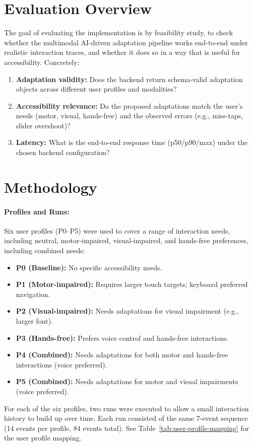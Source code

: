 \documentclass[openany]{book}
\begin{document}
\section{Evaluation Overview}
The goal of evaluating the implementation is by feasibility study, to check whether the multimodal AI-driven adaptation pipeline works end-to-end under realistic interaction traces, and whether it does so in a way that is useful for accessibility. Concretely:
\begin{enumerate}
    \item \textbf{Adaptation validity:} Does the backend return schema-valid adaptation objects across different user profiles and modalities?
    \item \textbf{Accessibility relevance:} Do the proposed adaptations match the user’s needs (motor, visual, hands-free) and the observed errors (e.g., miss-taps, slider overshoot)?
    \item \textbf{Latency:} What is the end-to-end response time (p50/p90/max) under the chosen backend configuration?
\end{enumerate}

\section{Methodology}
\paragraph{Profiles and Runs:}
Six user profiles (P0--P5) were used to cover a range of interaction needs, including neutral, motor-impaired, visual-impaired, and hands-free preferences, including combined needs:
\begin{itemize}
    \item \textbf{P0 (Baseline):} No specific accessibility needs.
    \item \textbf{P1 (Motor-impaired):} Requires larger touch targets; keyboard preferred navigation.
    \item \textbf{P2 (Visual-impaired):} Needs adaptations for visual impairment (e.g., larger font).
    \item \textbf{P3 (Hands-free):} Prefers voice control and hands-free interactions.
    \item \textbf{P4 (Combined):} Needs adaptations for both motor and hands-free interactions (voice preferred).
    \item \textbf{P5 (Combined):} Needs adaptations for motor and visual impairments (voice preferred).
\end{itemize}
For each of the six profiles, two runs were executed to allow a small interaction history to build up over time. Each run consisted of the same 7-event sequence (14 events per profile, 84 events total). See Table~\ref{tab:user-profile-mapping} for the user profile mapping.
\end{document}
